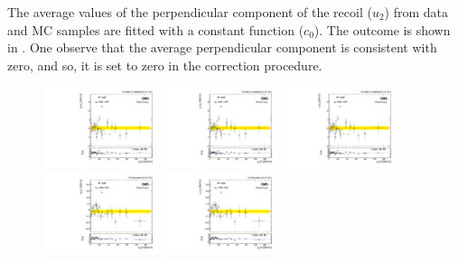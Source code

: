 The average values of the perpendicular component of the recoil ($u_{2}$) from data and MC \Z samples are fitted with a constant function ($c_{0}$). The outcome is shown in . One observe that the average perpendicular component is consistent with zero, and so, it is set to zero in the correction procedure.

\begin{figure}
 \begin{center}
  \includegraphics[width=0.3\textwidth]{Figures/WBoson/Analysis/Correction/Recoil/RecoilFitsqT/Data/fitPFu2mean1.pdf}
  \includegraphics[width=0.3\textwidth]{Figures/WBoson/Analysis/Correction/Recoil/RecoilFitsqT/Data/fitPFu2mean2.pdf}
  \includegraphics[width=0.3\textwidth]{Figures/WBoson/Analysis/Correction/Recoil/RecoilFitsqT/Data/fitPFu2mean.pdf} \\
  \includegraphics[width=0.3\textwidth]{Figures/WBoson/Analysis/Correction/Recoil/RecoilFitsqT/MC/fitPFu2mean1.pdf}
  \includegraphics[width=0.3\textwidth]{Figures/WBoson/Analysis/Correction/Recoil/RecoilFitsqT/MC/fitPFu2mean2.pdf}

\end{center}
\end{figure}
